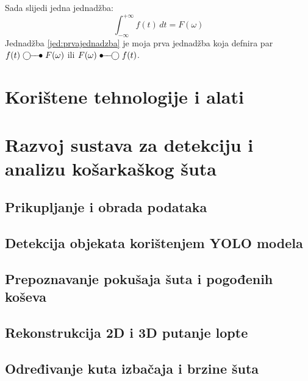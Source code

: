 \documentclass[zavrsnirad]{fer}
\begin{document}
Sada slijedi jedna jednadžba:
\begin{equation}
  \label{jed:prvajednadzba}
  \int_{-\infty}^{+\infty}f(t)\,dt=F(\omega)
\end{equation}
Jednadžba \eqref{jed:prvajednadzba} je moja prva jednadžba koja defnira par $f(t)\ufrek F(\omega)$ ili $F(\omega)\uvrem f(t)$.

\chapter{Korištene tehnologije i alati}
\label{pog:korištene_tehnologije_i_alati}


\chapter{Razvoj sustava za detekciju i analizu košarkaškog šuta}
\label{pog:razvoj_sustava_za_detekciju_i_analizu_kosarkaskog_suta}

\section{Prikupljanje i obrada podataka}
\label{pog:prikupljanje_i_obrada_podataka}

\section{Detekcija objekata korištenjem YOLO modela}
\label{pog:detekcija_objekata_koristenjem_yolo_modela}


\section{Prepoznavanje pokušaja šuta i pogođenih koševa}
\label{pog:prepoznavanje_pokusaja_suta_i_pogodenih_koseva}

\section{Rekonstrukcija 2D i 3D putanje lopte}
\label{pog:rekonstrukcija_2d_i_3d_putanje_lopte}

\section{Određivanje kuta izbačaja i brzine šuta}
\label{pog:odredivanje_kuta_izbacaja_i_brzine_suta}
\end{document}
